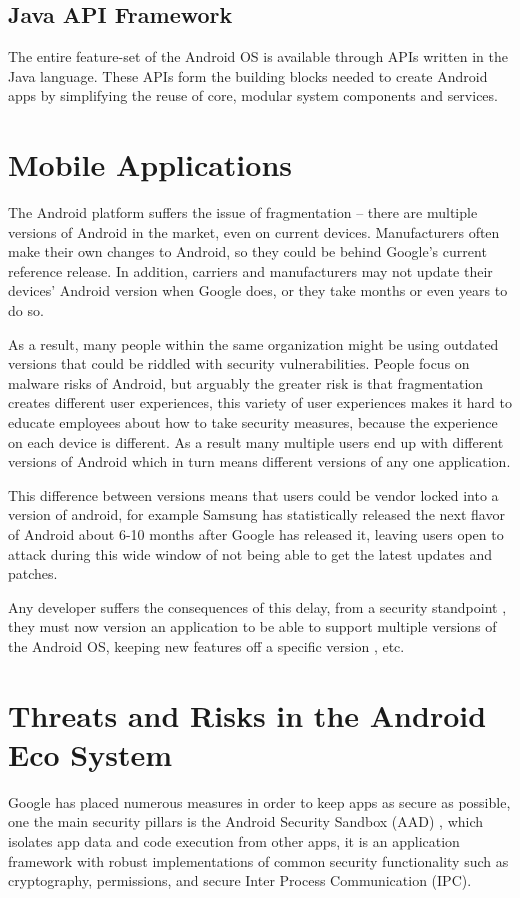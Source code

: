 \subsection{Java API Framework}
The entire feature-set of the Android OS is available through APIs written in the Java language. These APIs form the building blocks needed to create Android apps by simplifying the reuse of core, modular system components and services.

\section{Mobile Applications}
\label{sec:01mobileapp}
The Android platform suffers the issue of fragmentation -- there are multiple versions of Android in the market, even on current devices. Manufacturers often make their own changes to Android, so they could be behind Google's current reference release. In addition, carriers and manufacturers may not update their devices' Android version when Google does, or they take months or even years to do so.

As a result, many people within the same organization might be using outdated versions that could be riddled with security vulnerabilities. People focus on malware risks of Android, but arguably the greater risk is that fragmentation creates different user experiences, this variety of user experiences makes it hard to educate employees about how to take security measures, because the experience on each device is different. As a result many multiple users end up with different versions of Android which in turn means different versions of any one application.

This difference between versions means that users could be vendor locked into a version of android, for example Samsung has statistically released the next flavor of Android about 6-10 months after Google has released it, leaving users open to attack during this wide window of not being able to get the latest updates and patches.

Any developer suffers the consequences of this delay, from a security standpoint , they must now version an application to be able to support multiple versions of the Android OS, keeping new features off a specific version , etc. 

\section{Threats and Risks in the Android Eco System}
Google has placed numerous measures in order to keep apps as secure as possible, one the main security pillars is the Android Security Sandbox (AAD) , which isolates app data and code execution from other apps, it is an application framework with robust implementations of common security functionality such as cryptography, permissions, and secure Inter Process Communication (IPC).

